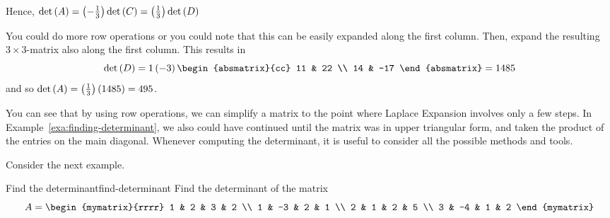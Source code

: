 \begin{solution}
Hence, $\det \left(A\right) = \left(-\frac{1}{3}\right) \det \left(C\right) = \left(\frac{1}{3}\right) \det \left(D\right)$ 

You could do more row operations or you could note that this can be easily
expanded along the first column. Then, expand the resulting $3 \times 3$-matrix
also along the first column. This results in 
\begin{equation*}
\det \tup{D} =1\tup{-3} \begin{absmatrix}{cc}
11 & 22 \\
14 & -17
\end{absmatrix}= 1485
\end{equation*}
and so  $\det \left(A\right) =\left(\frac{1}{3}\right) \left(1485\right)
=495$.
\end{solution} 

You can see that by using row operations, we can simplify a matrix
to the point where Laplace Expansion involves only a few steps. In Example~\ref{exa:finding-determinant}, we also could have continued until the matrix was in 
upper triangular form, and taken the product of the entries on the main diagonal. Whenever 
computing the determinant, it is useful to consider all the possible methods and tools.

Consider the next example.

\begin{example}{Find the determinant}{find-determinant}
Find the determinant of the matrix
\begin{equation*}
A = \begin{mymatrix}{rrrr}
1 & 2 & 3 & 2 \\
1 & -3 & 2 & 1 \\
2 & 1 & 2 & 5 \\
3 & -4 & 1 & 2
\end{mymatrix}
\end{equation*}
\end{example}


